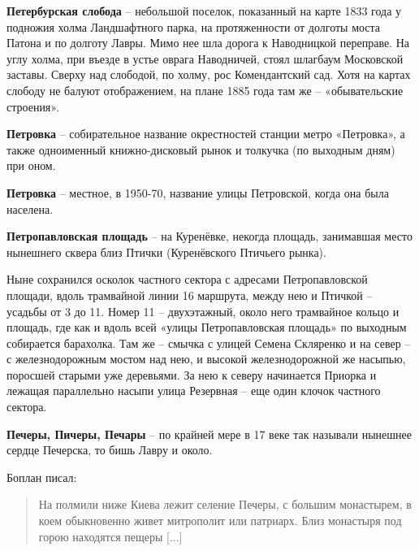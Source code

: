 \medskip

\textbf{Петербурская слобода} – небольшой поселок, показанный на карте 1833 года у подножия холма Ландшафтного парка, на протяженности от долготы моста Патона и по долготу Лавры. Мимо нее шла дорога к Наводницкой переправе. На углу холма, при въезде в устье оврага Наводничей, стоял шлагбаум Московской заставы. Сверху над слободой, по холму, рос Комендантский сад. Хотя на картах слободу не балуют отображением, на плане 1885 года там же – «обывательские строения».\\

\medskip


\textbf{Петровка} – собирательное название окрестностей станции метро «Петровка», а также одноименный книжно-дисковый рынок и толкучка (по выходным дням) при оном.\\

\medskip


\textbf{Петровка} – местное, в 1950-70, название улицы Петровской, когда она была населена.\\

\medskip

\textbf{Петропавловская площадь} – на Куренёвке, некогда площадь, занимавшая место нынешнего сквера близ Птички (Куренёвского Птичьего рынка). 

Ныне сохранился осколок частного сектора с адресами Петропавловской площади, вдоль трамвайной линии 16 маршрута, между нею и Птичкой – усадьбы от 3 до 11. Номер 11 – двухэтажный, около него трамвайное кольцо и площадь, где как и вдоль всей «улицы Петропавловская площадь» по выходным собирается барахолка. Там же – смычка с улицей Семена Скляренко и на север – с железнодорожным мостом над нею, и высокой железнодорожной же насыпью, поросшей старыми уже деревьями. За нею к северу начинается Приорка и лежащая параллельно насыпи улица Резервная – еще один клочок частного сектора.\\

\medskip



\textbf{Печеры, Пичеры, Печары} – по крайней мере в 17 веке так называли нынешнее сердце Печерска, то бишь Лавру и около.

Боплан писал:

\begin{quotation}На полмили ниже Киева лежит селение Печеры, с большим монастырем, в коем обыкновенно живет митрополит или патриарх. Близ монастыря под горою находятся пещеры [...]
\end{quotation}

